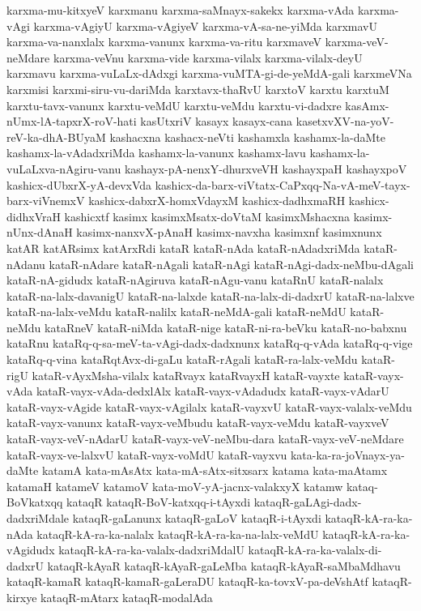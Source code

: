 {karxma-mu-kitxyeV
karxmanu
karxma-saMnayx-sakekx
karxma-vAda
karxma-vAgi
karxma-vAgiyU
karxma-vAgiyeV
karxma-vA-sa-ne-yiMda
karxmavU
karxma-va-nanxlalx
karxma-vanunx
karxma-va-ritu
karxmaveV
karxma-veV-neMdare
karxma-veVnu
karxma-vide
karxma-vilalx
karxma-vilalx-deyU
karxmavu
karxma-vuLaLx-dAdxgi
karxma-vuMTA-gi-de-yeMdA-gali
karxmeVNa
karxmisi
karxmi-siru-vu-dariMda
karxtavx-thaRvU
karxtoV
karxtu
karxtuM
karxtu-tavx-vanunx
karxtu-veMdU
karxtu-veMdu
karxtu-vi-dadxre
kasAmx-nUmx-lA-tapxrX-roV-hati
kasUtxriV
kasayx
kasayx-cana
kasetxvXV-na-yoV-reV-ka-dhA-BUyaM
kashacxna
kashacx-neVti
kashamxla
kashamx-la-daMte
kashamx-la-vAdadxriMda
kashamx-la-vanunx
kashamx-lavu
kashamx-la-vuLaLxva-nAgiru-vanu
kashayx-pA-nenxY-dhurxveVH
kashayxpaH
kashayxpoV
kashicx-dUbxrX-yA-devxVda
kashicx-da-barx-viVtatx-CaPxqq-Na-vA-meV-tayx-barx-viVnemxV
kashicx-dabxrX-homxVdayxM
kashicx-dadhxmaRH
kashicx-didhxVraH
kashicxtf
kasimx
kasimxMsatx-doVtaM
kasimxMshacxna
kasimx-nUnx-dAnaH
kasimx-nanxvX-pAnaH
kasimx-navxha
kasimxnf
kasimxnunx
katAR
katARsimx
katArxRdi
kataR
kataR-nAda
kataR-nAdadxriMda
kataR-nAdanu
kataR-nAdare
kataR-nAgali
kataR-nAgi
kataR-nAgi-dadx-neMbu-dAgali
kataR-nA-gidudx
kataR-nAgiruva
kataR-nAgu-vanu
kataRnU
kataR-nalalx
kataR-na-lalx-davanigU
kataR-na-lalxde
kataR-na-lalx-di-dadxrU
kataR-na-lalxve
kataR-na-lalx-veMdu
kataR-nalilx
kataR-neMdA-gali
kataR-neMdU
kataR-neMdu
kataRneV
kataR-niMda
kataR-nige
kataR-ni-ra-beVku
kataR-no-babxnu
kataRnu
kataRq-q-sa-meV-ta-vAgi-dadx-dadxnunx
kataRq-q-vAda
kataRq-q-vige
kataRq-q-vina
kataRqtAvx-di-gaLu
kataR-rAgali
kataR-ra-lalx-veMdu
kataR-rigU
kataR-vAyxMsha-vilalx
kataRvayx
kataRvayxH
kataR-vayxte
kataR-vayx-vAda
kataR-vayx-vAda-dedxlAlx
kataR-vayx-vAdadudx
kataR-vayx-vAdarU
kataR-vayx-vAgide
kataR-vayx-vAgilalx
kataR-vayxvU
kataR-vayx-valalx-veMdu
kataR-vayx-vanunx
kataR-vayx-veMbudu
kataR-vayx-veMdu
kataR-vayxveV
kataR-vayx-veV-nAdarU
kataR-vayx-veV-neMbu-dara
kataR-vayx-veV-neMdare
kataR-vayx-ve-lalxvU
kataR-vayx-voMdU
kataR-vayxvu
kata-ka-ra-joVnayx-ya-daMte
katamA
kata-mAsAtx
kata-mA-sAtx-sitxsarx
katama
kata-maAtamx
katamaH
katameV
katamoV
kata-moV-yA-jacnx-valakxyX
katamw
kataq-BoVkatxqq
kataqR
kataqR-BoV-katxqq-i-tAyxdi
kataqR-gaLAgi-dadx-dadxriMdale
kataqR-gaLanunx
kataqR-gaLoV
kataqR-i-tAyxdi
kataqR-kA-ra-ka-nAda
kataqR-kA-ra-ka-nalalx
kataqR-kA-ra-ka-na-lalx-veMdU
kataqR-kA-ra-ka-vAgidudx
kataqR-kA-ra-ka-valalx-dadxriMdalU
kataqR-kA-ra-ka-valalx-di-dadxrU
kataqR-kAyaR
kataqR-kAyaR-gaLeMba
kataqR-kAyaR-saMbaMdhavu
kataqR-kamaR
kataqR-kamaR-gaLeraDU
kataqR-ka-tovxV-pa-deVshAtf
kataqR-kirxye
kataqR-mAtarx
kataqR-modalAda
}
